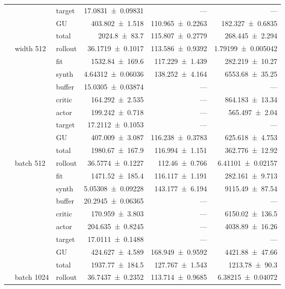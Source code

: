 {\begin{longtable}{@{}lllrrr@{}}
     &  & target & \num{17.0831+-0.09831} & --- & --- \\
     &  & GU & \num{403.802+-1.518} & \num{110.965+-0.2263} & \num{182.327+-0.6835} \\
     &  & total & \num{2024.8+-83.7} & \num{115.807+-0.2779} & \num{268.445+-2.294} \\
    \addlinespace[2pt]
     & width 512 & rollout & \num{36.1719+-0.1017} & \num{113.586+-0.9392} & \num{1.79199+-0.005042} \\
     &  & fit & \num{1532.84+-169.6} & \num{117.229+-1.439} & \num{282.219+-10.27} \\
     &  & synth & \num{4.64312+-0.06036} & \num{138.252+-4.164} & \num{6553.68+-35.25} \\
     &  & buffer & \num{15.0305+-0.03874} & --- & --- \\
     &  & critic & \num{164.292+-2.535} & --- & \num{864.183+-13.34} \\
     &  & actor & \num{199.242+-0.718} & --- & \num{565.497+-2.04} \\
     &  & target & \num{17.2112+-0.1053} & --- & --- \\
     &  & GU & \num{407.009+-3.087} & \num{116.238+-0.3783} & \num{625.618+-4.753} \\
     &  & total & \num{1980.67+-167.9} & \num{116.994+-1.151} & \num{362.776+-12.92} \\
    \addlinespace[2pt]
     & batch 512 & rollout & \num{36.5774+-0.1227} & \num{112.46+-0.766} & \num{6.41101+-0.02157} \\
     &  & fit & \num{1471.52+-185.4} & \num{116.117+-1.191} & \num{282.161+-9.713} \\
     &  & synth & \num{5.05308+-0.09228} & \num{143.177+-6.194} & \num{9115.49+-87.54} \\
     &  & buffer & \num{20.2945+-0.06365} & --- & --- \\
     &  & critic & \num{170.959+-3.803} & --- & \num{6150.02+-136.5} \\
     &  & actor & \num{204.635+-0.8245} & --- & \num{4038.89+-16.26} \\
     &  & target & \num{17.0111+-0.1488} & --- & --- \\
     &  & GU & \num{424.627+-4.589} & \num{168.949+-0.9592} & \num{4421.88+-47.66} \\
     &  & total & \num{1937.77+-184.5} & \num{127.767+-1.543} & \num{1213.78+-90.3} \\
    \addlinespace[2pt]
     & batch 1024 & rollout & \num{36.7437+-0.2352} & \num{113.714+-0.9685} & \num{6.38215+-0.04072} \\

\end{longtable}}
